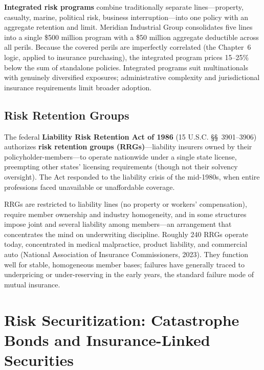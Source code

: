 \documentclass[11pt,openany]{book}
\begin{document}
\textbf{Integrated risk programs} combine traditionally separate
lines---property, casualty, marine, political risk, business
interruption---into one policy with an aggregate retention and limit.
Meridian Industrial Group consolidates five lines into a single \$500 million
program with a \$50 million aggregate deductible across all perils. Because
the covered perils are imperfectly correlated (the
Chapter~6 logic, applied to insurance purchasing),
the integrated program prices 15--25\% below the sum of standalone policies.
Integrated programs suit multinationals with genuinely diversified exposures;
administrative complexity and jurisdictional insurance requirements limit
broader adoption.

\subsection{Risk Retention Groups}

The federal \textbf{Liability Risk Retention Act of 1986} (15 U.S.C.
\S\S~3901--3906) authorizes \textbf{risk retention groups (RRGs)}---liability
insurers owned by their policyholder-members---to operate nationwide under a
single state license, preempting other states' licensing requirements (though
not their solvency oversight). The Act responded to the liability crisis of
the mid-1980s, when entire professions faced unavailable or unaffordable
coverage.

RRGs are restricted to liability lines (no property or workers'
compensation), require member ownership and industry homogeneity, and in some
structures impose joint and several liability among members---an arrangement
that concentrates the mind on underwriting discipline. Roughly 240 RRGs
operate today, concentrated in medical malpractice, product liability, and
commercial auto (National Association of Insurance Commissioners, 2023). They
function well for stable, homogeneous member bases; failures have generally
traced to underpricing or under-reserving in the early years, the standard
failure mode of mutual insurance.

\section{Risk Securitization: Catastrophe Bonds and Insurance-Linked
Securities}
\label{sec:securitization}
\end{document}
